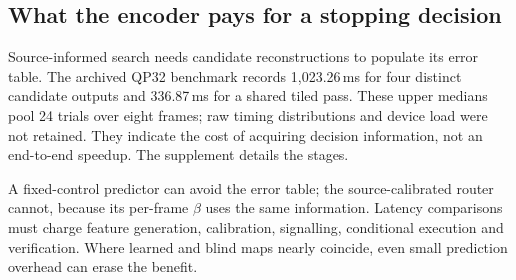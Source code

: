\subsection{What the encoder pays for a stopping decision}

Source-informed search needs candidate reconstructions to populate its error
table. The archived QP32 benchmark records 1,023.26\,ms for four distinct
candidate outputs and 336.87\,ms for a shared tiled pass. These upper
medians pool 24 trials over eight frames; raw timing distributions and
device load were not retained. They indicate the cost of acquiring decision
information, not an end-to-end speedup. The supplement details the stages.

A fixed-control predictor can avoid the error table; the source-calibrated
router cannot, because its per-frame $\beta$ uses the same information.
Latency comparisons must charge feature generation, calibration, signalling,
conditional execution and verification. Where learned and blind maps nearly
coincide, even small prediction overhead can erase the benefit.
